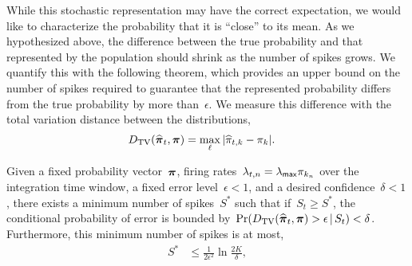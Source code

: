 While this stochastic representation may have the correct expectation, we
would like to characterize the probability that it is ``close'' to its
mean. As we hypothesized above, the difference between the true
probability and that represented by the population should shrink as
the number of spikes grows. We quantify this with the following
theorem, which provides an upper bound on the number of spikes
required to guarantee that the represented probability differs from
the true probability by more than~$\epsilon$. We measure this
difference with the total variation distance between the
distributions,
\begin{align}
  {D_{\mathrm{TV}}}(\widehat{\boldsymbol{\pi}}_t, \boldsymbol{\pi}) &= 
  \max_{\ell} |\widehat{\pi}_{t,k} - \pi_{k}|.
\end{align}

\begin{theorem}
\label{thm:fixed_count}
Given a fixed probability vector~$\boldsymbol{\pi}$, firing
rates~$\lambda_{t,n} = \lambda_{\mathsf{max}} \pi_{k_n}$ over the integration
time window, a fixed error level~$\epsilon < 1$, and a desired
confidence~$\delta < 1$, there exists a minimum number of spikes~$S^*$
such that if~$S_t \geq S^*$, the conditional probability of error is
bounded
by~$\Pr({D_{\mathrm{TV}}}(\widehat{\boldsymbol{\pi}}_t, \boldsymbol{\pi}) > \epsilon \,|\, S_t) <
\delta$.  Furthermore, this minimum number of spikes is at most,
\begin{align}
S^* &\leq \frac{1}{2\epsilon^2} \ln \frac{2K}{\delta},  
\end{align}
\end{theorem}

